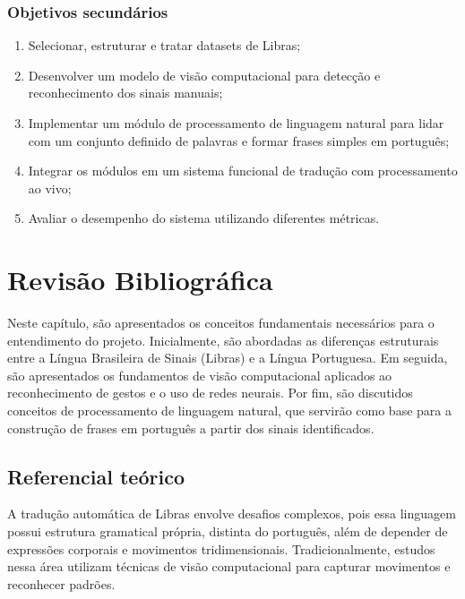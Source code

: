 \documentclass[
    12pt,                %
    openright,           %
    oneside,             %
    a4paper,             %
    english,             %
    brazil               %
]{abntex2}
\begin{document}
\subsection{Objetivos secundários}

\begin{enumerate}
    \item Selecionar, estruturar e tratar datasets de Libras;
    \item Desenvolver um modelo de visão computacional para detecção e reconhecimento dos sinais manuais;
    \item Implementar um módulo de processamento de linguagem natural para lidar com um conjunto definido de palavras e formar frases simples em português;
    \item Integrar os módulos em um sistema funcional de tradução com processamento ao vivo;
    \item Avaliar o desempenho do sistema utilizando diferentes métricas.
\end{enumerate}

\chapter{Revisão Bibliográfica}
\label{cap:revisao}

Neste capítulo, são apresentados os conceitos fundamentais necessários para o entendimento do projeto. Inicialmente, são abordadas as diferenças estruturais entre a Língua Brasileira de Sinais (Libras) e a Língua Portuguesa. Em seguida, são apresentados os fundamentos de visão computacional aplicados ao reconhecimento de gestos e o uso de redes neurais. Por fim, são discutidos conceitos de processamento de linguagem natural, que servirão como base para a construção de frases em português a partir dos sinais identificados.

\section{Referencial teórico}
\label{sec:referencial}

A tradução automática de Libras envolve desafios complexos, pois essa linguagem possui estrutura gramatical própria, distinta do português, além de depender de expressões corporais e movimentos tridimensionais. Tradicionalmente, estudos nessa área utilizam técnicas de visão computacional para capturar movimentos e reconhecer padrões.
\end{document}
